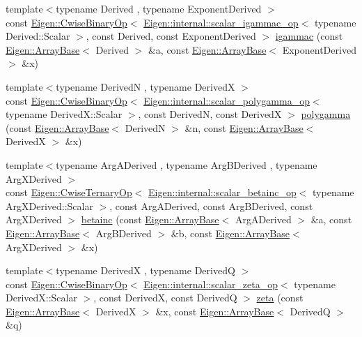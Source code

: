 \begin{DoxyCompactItemize}
{\footnotesize template$<$typename Derived , typename Exponent\+Derived $>$ }\\const \hyperlink{group___core___module_class_eigen_1_1_cwise_binary_op}{Eigen\+::\+Cwise\+Binary\+Op}$<$ \hyperlink{struct_eigen_1_1internal_1_1scalar__igammac__op}{Eigen\+::internal\+::scalar\+\_\+igammac\+\_\+op}$<$ typename Derived\+::\+Scalar $>$, const Derived, const Exponent\+Derived $>$ \hyperlink{namespace_eigen_a1abaa2ff8c7b1871eaf026a47c6bbf3b}{igammac} (const \hyperlink{group___core___module_class_eigen_1_1_array_base}{Eigen\+::\+Array\+Base}$<$ Derived $>$ \&a, const \hyperlink{group___core___module_class_eigen_1_1_array_base}{Eigen\+::\+Array\+Base}$<$ Exponent\+Derived $>$ \&x)
\item 
{\footnotesize template$<$typename DerivedN , typename DerivedX $>$ }\\const \hyperlink{group___core___module_class_eigen_1_1_cwise_binary_op}{Eigen\+::\+Cwise\+Binary\+Op}$<$ \hyperlink{struct_eigen_1_1internal_1_1scalar__polygamma__op}{Eigen\+::internal\+::scalar\+\_\+polygamma\+\_\+op}$<$ typename Derived\+X\+::\+Scalar $>$, const DerivedN, const DerivedX $>$ \hyperlink{namespace_eigen_ae3b47a13a0699f5dbaa0623c11333dca}{polygamma} (const \hyperlink{group___core___module_class_eigen_1_1_array_base}{Eigen\+::\+Array\+Base}$<$ DerivedN $>$ \&n, const \hyperlink{group___core___module_class_eigen_1_1_array_base}{Eigen\+::\+Array\+Base}$<$ DerivedX $>$ \&x)
\item 
{\footnotesize template$<$typename Arg\+A\+Derived , typename Arg\+B\+Derived , typename Arg\+X\+Derived $>$ }\\const \hyperlink{group___core___module_class_eigen_1_1_cwise_ternary_op}{Eigen\+::\+Cwise\+Ternary\+Op}$<$ \hyperlink{struct_eigen_1_1internal_1_1scalar__betainc__op}{Eigen\+::internal\+::scalar\+\_\+betainc\+\_\+op}$<$ typename Arg\+X\+Derived\+::\+Scalar $>$, const Arg\+A\+Derived, const Arg\+B\+Derived, const Arg\+X\+Derived $>$ \hyperlink{namespace_eigen_a81f796c95561b9847eb8a6b8ccfa3e7d}{betainc} (const \hyperlink{group___core___module_class_eigen_1_1_array_base}{Eigen\+::\+Array\+Base}$<$ Arg\+A\+Derived $>$ \&a, const \hyperlink{group___core___module_class_eigen_1_1_array_base}{Eigen\+::\+Array\+Base}$<$ Arg\+B\+Derived $>$ \&b, const \hyperlink{group___core___module_class_eigen_1_1_array_base}{Eigen\+::\+Array\+Base}$<$ Arg\+X\+Derived $>$ \&x)
\item 
{\footnotesize template$<$typename DerivedX , typename DerivedQ $>$ }\\const \hyperlink{group___core___module_class_eigen_1_1_cwise_binary_op}{Eigen\+::\+Cwise\+Binary\+Op}$<$ \hyperlink{struct_eigen_1_1internal_1_1scalar__zeta__op}{Eigen\+::internal\+::scalar\+\_\+zeta\+\_\+op}$<$ typename Derived\+X\+::\+Scalar $>$, const DerivedX, const DerivedQ $>$ \hyperlink{namespace_eigen_af9555e27540da78d2c4bdd17d3b750b1}{zeta} (const \hyperlink{group___core___module_class_eigen_1_1_array_base}{Eigen\+::\+Array\+Base}$<$ DerivedX $>$ \&x, const \hyperlink{group___core___module_class_eigen_1_1_array_base}{Eigen\+::\+Array\+Base}$<$ DerivedQ $>$ \&q)

\end{DoxyCompactItemize}
